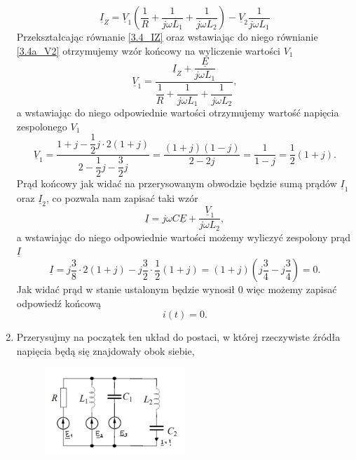 \documentclass[12pt, a4paper]{article}
\begin{document}
\begin{enumerate}[label=\alph*)]
\begin{equation}
          \underline{I}_Z = \underline{V}_1 \left(\frac{1}{R}+
          \frac{1}{j\omega L_1}+\frac{1}{j\omega L_2}\right) - \underline{V}_2
          \frac{1}{j\omega L_1}
        \end{equation}
        Przekształcając równanie \ref{3.4_IZ} oraz wstawiając do niego równianie \ref{3.4a_V2}
        otrzymujemy wzór końcowy na wyliczenie wartości $V_1$
        \begin{equation*}
          \underline{V}_1 = \frac{\underline{I}_Z+\dfrac{\underline{E}}{j\omega L_1}}
          {\dfrac{1}{R}+\dfrac{1}{j\omega L_1}+\dfrac{1}{j\omega L_2}},
        \end{equation*}
        a wstawiając do niego odpowiednie wartości otrzymujemy wartość napięcia zespolonego
        $V_1$
        \begin{equation*}
          \underline{V}_1 = \frac{1+j-\dfrac{1}{2}j\cdot2(1+j)}
          {2-\dfrac{1}{2}j-\dfrac{3}{2}j} = \frac{(1+j)(1-j)}{2-2j} = \frac{1}{1-j}
          = \frac{1}{2}(1+j).
        \end{equation*}
        Prąd końcowy jak widać na przerysowanym obwodzie będzie sumą prądów
        $\underline{I}_1$ oraz $\underline{I}_2$, co pozwala nam zapisać taki wzór
        \begin{equation*}
          \underline{I} = j\omega C\underline{E} + \frac{\underline{V}_1}{j\omega L_2},
        \end{equation*}
        a wstawiając do niego odpowiednie wartości możemy wyliczyć zespolony prąd
        $\underline{I}$
        \begin{equation*}
          \underline{I} = j\frac{3}{8}\cdot2(1+j)-j\frac{3}{2}\cdot\frac{1}{2}
          (1+j) = (1+j)\left(j\frac{3}{4}-j\frac{3}{4}\right) = 0.
        \end{equation*}
        Jak widać prąd w stanie ustalonym będzie wynosił $0$ więc możemy zapisać
        odpowiedź końcową
        \begin{equation*}
          i(t) = 0.
        \end{equation*}
  \item Przerysujmy na początek ten układ do postaci, w której rzeczywiste źródła
        napięcia będą się znajdowały obok siebie,
        \begin{figure}[H]
          \centering
          \includegraphics[width = 0.5\textwidth]{./images/Lista_3/3.4.2.png}

\end{figure}
\end{enumerate}
\end{document}
